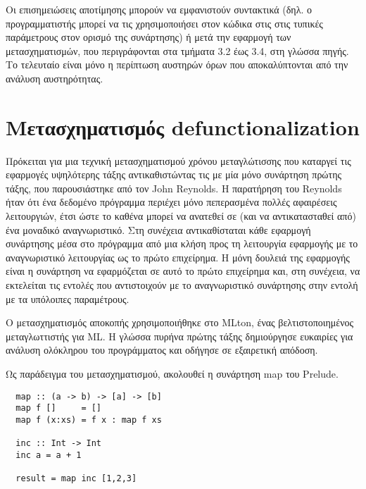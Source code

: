 \documentclass[diploma]{softlab-thesis}
\begin{document}
Οι επισημειώσεις αποτίμησης μπορούν να εμφανιστούν συντακτικά (δηλ. 
ο προγραμματιστής μπορεί να τις χρησιμοποιήσει στον κώδικα στις
στις τυπικές παράμετρους στον ορισμό της συνάρτησης) ή
μετά την εφαρμογή των μετασχηματισμών, που περιγράφονται στα τμήματα 3.2 έως 3.4,
στη γλώσσα πηγής. Το τελευταίο
είναι μόνο η περίπτωση αυστηρών όρων που αποκαλύπτονται από την ανάλυση αυστηρότητας.

\section{Μετασχηματισμός defunctionalization}

Πρόκειται για μια τεχνική μετασχηματισμού χρόνου μεταγλώτισσης που καταργεί τις εφαρμογές 
υψηλότερης τάξης
αντικαθιστώντας τις με μία μόνο συνάρτηση πρώτης τάξης, που παρουσιάστηκε από τον 
John Reynolds.
Η παρατήρηση του Reynolds ήταν ότι ένα δεδομένο πρόγραμμα περιέχει μόνο πεπερασμένα 
πολλές αφαιρέσεις λειτουργιών, έτσι ώστε το καθένα μπορεί
να ανατεθεί σε (και να αντικατασταθεί από) ένα μοναδικό αναγνωριστικό. Στη συνέχεια 
αντικαθίσταται κάθε εφαρμογή συνάρτησης μέσα στο πρόγραμμα
από μια κλήση προς τη λειτουργία εφαρμογής με το αναγνωριστικό λειτουργίας 
ως το πρώτο επιχείρημα. Η μόνη δουλειά της εφαρμογής είναι η συνάρτηση
να εφαρμόζεται σε αυτό το πρώτο επιχείρημα και, στη συνέχεια, να εκτελείται
τις εντολές που αντιστοιχούν με το αναγνωριστικό συνάρτησης στην εντολή με τα 
υπόλοιπες παραμέτρους.


Ο μετασχηματισμός αποκοπής χρησιμοποιήθηκε στο MLton, ένας βελτιστοποιημένος μεταγλωττιστής για ML. 
Η γλώσσα πυρήνα πρώτης τάξης δημιούργησε ευκαιρίες για ανάλυση ολόκληρου του προγράμματος και 
οδήγησε σε εξαιρετική απόδοση.

Ως παράδειγμα του μετασχηματισμού, ακολουθεί η συνάρτηση map του Prelude.

\begin{verbatim}
  map :: (a -> b) -> [a] -> [b]
  map f []     = []
  map f (x:xs) = f x : map f xs

  inc :: Int -> Int 
  inc a = a + 1
  
  result = map inc [1,2,3]
\end{verbatim}
\end{document}
